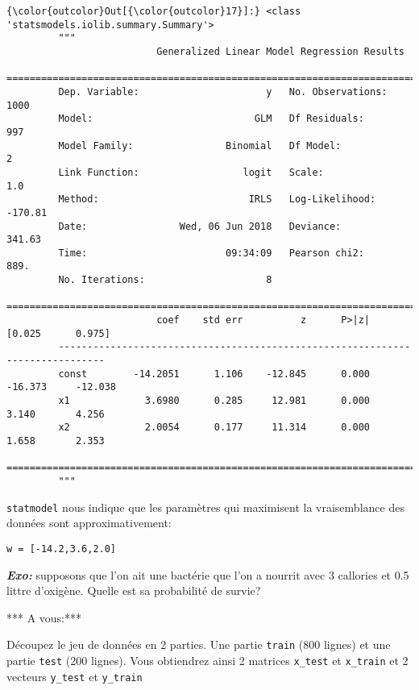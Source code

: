 \documentclass[11pt]{article}
\begin{document}
\begin{Verbatim}[commandchars=\\\{\}]
{\color{outcolor}Out[{\color{outcolor}17}]:} <class 'statsmodels.iolib.summary.Summary'>
         """
                          Generalized Linear Model Regression Results                  
         ==============================================================================
         Dep. Variable:                      y   No. Observations:                 1000
         Model:                            GLM   Df Residuals:                      997
         Model Family:                Binomial   Df Model:                            2
         Link Function:                  logit   Scale:                             1.0
         Method:                          IRLS   Log-Likelihood:                -170.81
         Date:                Wed, 06 Jun 2018   Deviance:                       341.63
         Time:                        09:34:09   Pearson chi2:                     889.
         No. Iterations:                     8                                         
         ==============================================================================
                          coef    std err          z      P>|z|      [0.025      0.975]
         ------------------------------------------------------------------------------
         const        -14.2051      1.106    -12.845      0.000     -16.373     -12.038
         x1             3.6980      0.285     12.981      0.000       3.140       4.256
         x2             2.0054      0.177     11.314      0.000       1.658       2.353
         ==============================================================================
         """
\end{Verbatim}
            
    \texttt{statmodel} nous indique que les paramètres qui maximisent la
vraisemblance des données sont approximativement:

\begin{verbatim}
w = [-14.2,3.6,2.0]
\end{verbatim}

\textbf{\emph{Exo:}} supposons que l'on ait une bactérie que l'on a
nourrit avec 3 callories et 0.5 littre d'oxigène. Quelle est sa
probabilité de survie?

    *** A vous:***

Découpez le jeu de données en 2 parties. Une partie \texttt{train} (800
lignes) et une partie \texttt{test} (200 lignes). Vous obtiendrez ainsi
2 matrices \texttt{x\_test} et \texttt{x\_train} et 2 vecteurs
\texttt{y\_test} et \texttt{y\_train}
\end{document}
